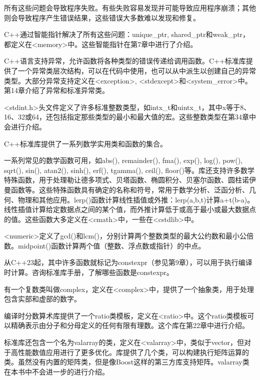 所有这些问题会导致程序失败。有些失败容易发现并可能导致应用程序崩溃；其他则会导致程序产生错误结果，这些错误大多数难以发现和修复。

C++通过智能指针解决了所有这些问题：unique\_ptr, shared\_ptr和weak\_ptr，都定义在<memory>中。这些智能指针在第7章中进行了介绍。


C++语言支持异常，允许函数将各种类型的错误传递给调用函数。C++标准库提供了一个异常类层次结构，可以在代码中使用，也可以从中派生以创建自己的异常类型。大部分异常支持定义在<exception>, <stdexcept>和<system\_error>中。第14章介绍了异常和标准异常类。


<stdint.h>头文件定义了许多标准整数类型，如intx\_t和uintx\_t，其中x等于8、16、32或64，还包括指定那些类型的最小和最大值的宏。这些整数类型在第34章中会进行介绍。


C++标准库提供了一系列数学实用类和函数的集合。

一系列常见的数学函数可用，如abs(), remainder(), fma(), exp(), log(), pow(), sqrt(), sin(), atan2(), sinh(), erf(), tgamma(), ceil(), floor()等。库还支持许多数学特殊函数，用于处理勒让德多项式、贝塔函数、椭圆积分、贝塞尔函数、圆柱诺伊曼函数等。这些特殊函数具有确定的名称和符号，常用于数学分析、泛函分析、几何、物理和其他应用。lerp()函数计算线性插值或外推：lerp(a,b,t)计算a+t(b-a)。线性插值计算给定数据点之间的某个值，而外推计算低于或高于最小或最大数据点的值。这些函数大多定义在<cmath>中，一些在<cstdlib>中。

<numeric>定义了gcd()和lcm()，分别计算两个整数类型的最大公约数和最小公倍数。midpoint()函数计算两个值（整数、浮点数或指针）的中点。

从C++23起，其中许多函数就标记为constexpr（参见第9章），可以用于执行编译时计算。咨询标准库手册，了解哪些函数是constexpr。

有一个复数类叫做complex，定义在<complex>中，提供了一个抽象类，用于处理包含实部和虚部的数字。

编译时分数算术库提供了一个ratio类模板，定义在<ratio>中。这个ratio类模板可以精确表示由分子和分母定义的任何有限有理数。这个库在第22章中进行介绍。

标准库还包含一个名为valarray的类，定义在<valarray>中，类似于vector，但对于高性能数值应用进行了更多优化。库提供了几个类，可以构建执行矩阵运算的类。虽然没有内置的矩阵类，但是像Boost这样的第三方库支持矩阵。valarray类在本书中不会进一步的进行介绍。

